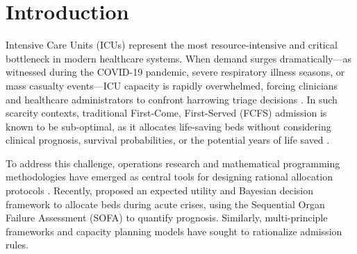 \documentclass{ro}
\begin{document}

\maketitle


\section{Introduction}
\label{sec:intro}

Intensive Care Units (ICUs) represent the most resource-intensive and critical bottleneck in modern healthcare systems. When demand surges dramatically---as witnessed during the COVID-19 pandemic, severe respiratory illness seasons, or mass casualty events---ICU capacity is rapidly overwhelmed, forcing clinicians and healthcare administrators to confront harrowing triage decisions \cite{grasselli2020critical, aquino2022ethical}. In such scarcity contexts, traditional First-Come, First-Served (FCFS) admission is known to be sub-optimal, as it allocates life-saving beds without considering clinical prognosis, survival probabilities, or the potential years of life saved \cite{craxi2020rationing, dieteren2022should}.

To address this challenge, operations research and mathematical programming methodologies have emerged as central tools for designing rational allocation protocols \cite{dantzig2002linear, wolsey2020integer, frej2021decision}. Recently, \cite{frej2023collaborative} proposed an expected utility and Bayesian decision framework to allocate beds during acute crises, using the Sequential Organ Failure Assessment (SOFA) to quantify prognosis. Similarly, multi-principle frameworks \cite{White_2021} and capacity planning models \cite{Alban_2020, Schmidt_2021} have sought to rationalize admission rules.
\end{document}
